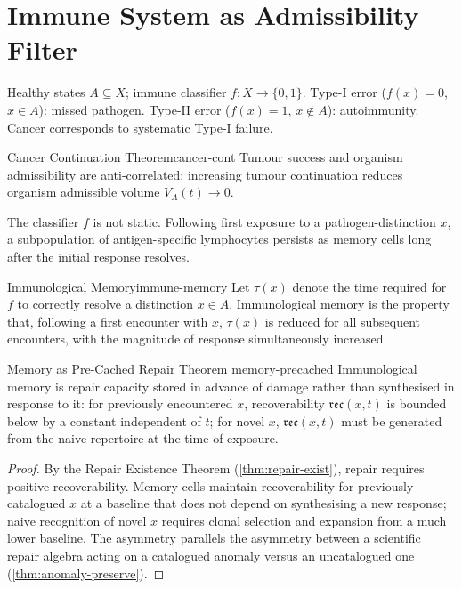 \documentclass[12pt,twoside,openright]{book}
\newcommand{\reco}{\mathfrak{rec}}
\begin{document}
\section{Immune System as Admissibility Filter}

Healthy states $A \subseteq X$; immune classifier
$f: X \to \{0,1\}$.
Type-I error ($f(x)=0$, $x \in A$): missed pathogen.
Type-II error ($f(x)=1$, $x \notin A$): autoimmunity.
Cancer corresponds to systematic Type-I failure.

\begin{theorem}{Cancer Continuation Theorem}{cancer-cont}
  Tumour success and organism admissibility are
  anti-correlated: increasing tumour continuation reduces
  organism admissible volume $V_A(t) \to 0$.
\end{theorem}

The classifier $f$ is not static. Following first exposure to a
pathogen-distinction $x$, a subpopulation of antigen-specific
lymphocytes persists as memory cells long after the initial
response resolves.

\begin{definition}{Immunological Memory}{immune-memory}
  Let $\tau(x)$ denote the time required for $f$ to correctly
  resolve a distinction $x \in A$. Immunological memory is the
  property that, following a first encounter with $x$, $\tau(x)$
  is reduced for all subsequent encounters, with the magnitude
  of response simultaneously increased.
\end{definition}

\begin{theorem}{Memory as Pre-Cached Repair Theorem}%
  {memory-precached}
  Immunological memory is repair capacity stored in advance of
  damage rather than synthesised in response to it: for
  previously encountered $x$, recoverability $\reco(x,t)$ is
  bounded below by a constant independent of $t$; for novel
  $x$, $\reco(x,t)$ must be generated from the naive repertoire
  at the time of exposure.
\end{theorem}

\begin{proof}
  By the Repair Existence Theorem (\cref{thm:repair-exist}),
  repair requires positive recoverability. Memory cells
  maintain recoverability for previously catalogued $x$ at a
  baseline that does not depend on synthesising a new response;
  naive recognition of novel $x$ requires clonal selection and
  expansion from a much lower baseline. The asymmetry parallels
  the asymmetry between a scientific repair algebra acting on a
  catalogued anomaly versus an uncatalogued one
  (\cref{thm:anomaly-preserve}).
\end{proof}
\end{document}
